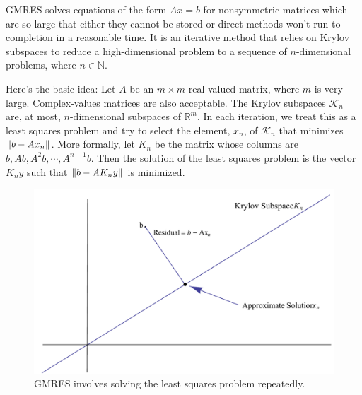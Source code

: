 \label{lab:GMRES}

GMRES solves equations of the form $Ax=b$ for nonsymmetric matrices which are so large that either they cannot be stored or direct methods won't run to completion in a reasonable time.
It is an iterative method that relies on Krylov subspaces to reduce a high-dimensional problem to a sequence of $n$-dimensional problems, where $n \in \mathbb{N}$.

Here's the basic idea: Let $A$ be an $m\times m$ real-valued matrix, where $m$ is very large.
Complex-values matrices are also acceptable.
The Krylov subspaces $\mathcal{K}_n$ are, at most, $n$-dimensional subspaces of $\mathbb{R}^m$.
In each iteration, we treat this as a least squares problem and try to select the element, $x_n$, of $\mathcal{K}_n$ that minimizes $\left\lVert b - A x_n\right\rVert$.
More formally, let $K_n$ be the matrix whose columns are $b, Ab, A^{2}b, \cdots, A^{n-1}b$.
Then the solution of the least squares problem is the vector $K_{n}y$ such that $\left\lVert b-A K_{n}y\right\rVert$ is minimized.
\begin{figure}
\includegraphics[width=\textwidth]{LeastSquares}
\caption{GMRES involves solving the least squares problem repeatedly.}
\end{figure}

